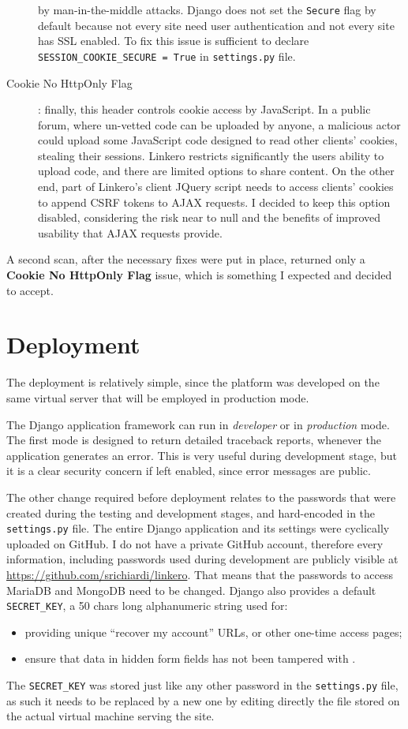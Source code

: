 \begin{description}
  by man-in-the-middle attacks. Django does not set the \texttt{Secure} flag by
  default because not every site need user authentication and not every site has
  SSL enabled. To fix this issue is sufficient to declare
  \texttt{SESSION\_COOKIE\_SECURE = True} in \texttt{settings.py} file.
  \item[Cookie No HttpOnly Flag]: finally, this header controls cookie access by
  JavaScript. In a public forum, where un-vetted code can be uploaded by anyone,
  a malicious actor could upload some JavaScript code designed to read other
  clients' cookies, stealing their sessions. Linkero restricts significantly the
  users ability to upload code, and there are limited options to share content.
  On the other end, part of Linkero's client JQuery script needs to access
  clients' cookies to append CSRF tokens to AJAX requests. I decided to keep
  this option disabled, considering the risk near to null and the benefits of
  improved usability that AJAX requests provide.
\end{description}

A second scan, after the necessary fixes were put in place, returned only a
\textbf{Cookie No HttpOnly Flag} issue, which is something I expected and
decided to accept.


\section{Deployment}
The deployment is relatively simple, since the platform was developed on the same
virtual server that will be employed in production mode.

The Django application framework can run in \emph{developer} or in
\emph{production} mode. The first mode is designed to return detailed traceback
reports, whenever the application generates an error. This is very useful during
development stage, but it is a clear security concern if left enabled, since
error messages are public.

The other change required before deployment relates to the passwords that were
created during the testing and development stages, and hard-encoded in the
\texttt{settings.py} file. The entire Django application and its settings were
cyclically uploaded on GitHub\texttrademark. I do not have a private
GitHub account, therefore every information, including passwords used during
development are publicly visible at \url{https://github.com/srichiardi/linkero}.
That means that the passwords to access MariaDB and MongoDB need to be changed.
Django also provides a default \texttt{SECRET\_KEY}, a 50 chars long
alphanumeric string used for:
\begin{itemize}
  \item providing unique ``recover my account'' URLs, or other one-time access
  pages;
  \item ensure that data in hidden form fields has not been tampered with
  \cite{djsecr}.
\end{itemize}
The \texttt{SECRET\_KEY} was stored just like any other password in the
\texttt{settings.py} file, as such it needs to be replaced by a new one
by editing directly the file stored on the actual virtual machine serving
the site.
